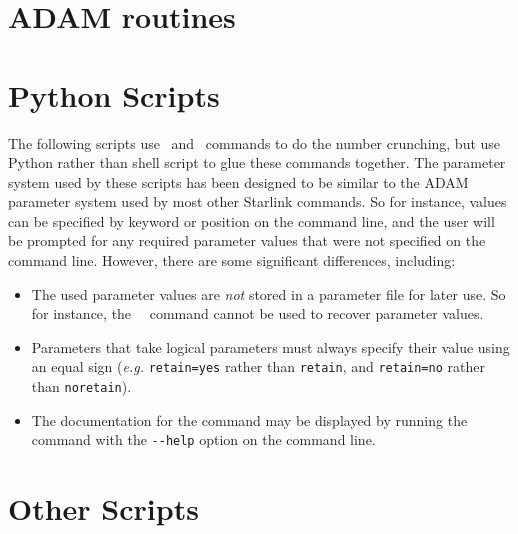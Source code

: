 \documentclass[oneside,11pt]{starlink}
\begin{document}
\section{ADAM routines}

\clearpage

\section{Python Scripts}

The following scripts use \KAPPA\ and \SMURF\ commands to do the number
crunching, but use Python rather than shell script to glue these commands
together. The parameter system used by these scripts has been designed to
be similar to the ADAM parameter system used by most other Starlink
commands. So for instance, values can be specified by keyword or position
on the command line, and the user will be prompted for any required parameter
values that were not specified on the command line. However, there are some
significant differences, including:

\begin{itemize}
\item The used parameter values are \emph{not} stored in a parameter file for
later use. So for instance, the \KAPPA\ \parget\ command cannot be used
to recover parameter values.
\item Parameters that take logical parameters must always specify their
value using an equal sign (\emph{e.g.} \verb+retain=yes+ rather than
\verb+retain+, and \verb+retain=no+ rather than \verb+noretain+).
\item The documentation for the command may be displayed by running the
command with the \verb+--help+ option on the command line.
\end{itemize}


\clearpage

\section{Other Scripts}

\end{document}
